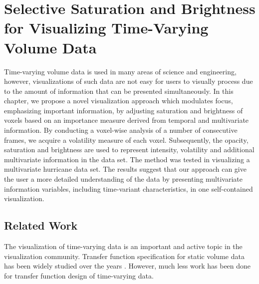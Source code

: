 \chapter{Selective Saturation and Brightness for Visualizing Time-Varying Volume Data \label{selective_saturation_brightness}}
Time-varying volume data is used in many areas of science and engineering, however, visualizations of such data are not easy for users to visually process due to the amount of information that can be presented simultaneously. In this chapter, we propose a novel visualization approach which modulates focus, emphasizing important information, by adjusting saturation and brightness of voxels based on an importance measure derived from temporal and multivariate information. By conducting a voxel-wise analysis of a number of consecutive frames, we acquire a volatility measure of each voxel.
Subsequently, the opacity, saturation and brightness are used to represent intensity, volatility and additional multivariate information in the data set.
The method was tested in visualizing a multivariate hurricane data set. The results suggest that our approach can give the user a more detailed understanding of the data by presenting multivariate information variables, including time-variant characteristics, in one self-contained visualization.

%

\section{Related Work}
The visualization of time-varying data is an important and active topic in the visualization community. Transfer function specification for static volume data has been widely studied over the years \cite{pfister_transfer_2001}. However, much less work has been done for transfer function design of time-varying data.

